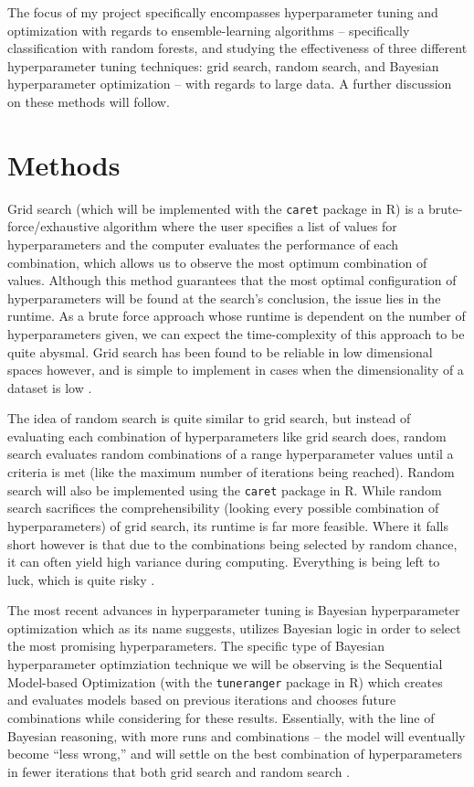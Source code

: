 \documentclass[12pt]{article}
\begin{document}
\label{sec:question}

The focus of my project specifically encompasses hyperparameter tuning
and optimization with regards to ensemble-learning algorithms --
specifically classification with random forests, and studying the
effectiveness of three different hyperparameter tuning techniques: grid
search, random search, and Bayesian hyperparameter optimization -- with
regards to large data. A further discussion on these methods will
follow.

\hypertarget{methods}{%
\section{Methods}\label{methods}}

\label{sec:methods}

Grid search (which will be implemented with the \texttt{caret} package
in R) is a brute-force/exhaustive algorithm where the user specifies a
list of values for hyperparameters and the computer evaluates the
performance of each combination, which allows us to observe the most
optimum combination of values. Although this method guarantees that the
most optimal configuration of hyperparameters will be found at the
search's conclusion, the issue lies in the runtime. As a brute force
approach whose runtime is dependent on the number of hyperparameters
given, we can expect the time-complexity of this approach to be quite
abysmal. Grid search has been found to be reliable in low dimensional
spaces however, and is simple to implement in cases when the
dimensionality of a dataset is low \citep{Bergstra2012}.

The idea of random search is quite similar to grid search, but instead
of evaluating each combination of hyperparameters like grid search does,
random search evaluates random combinations of a range hyperparameter
values until a criteria is met (like the maximum number of iterations
being reached). Random search will also be implemented using the
\texttt{caret} package in R. While random search sacrifices the
comprehensibility (looking every possible combination of
hyperparameters) of grid search, its runtime is far more feasible. Where
it falls short however is that due to the combinations being selected by
random chance, it can often yield high variance during computing.
Everything is being left to luck, which is quite risky
\citep{Bergstra2012}.

The most recent advances in hyperparameter tuning is Bayesian
hyperparameter optimization which as its name suggests, utilizes
Bayesian logic in order to select the most promising hyperparameters.
The specific type of Bayesian hyperparameter optimziation technique we
will be observing is the Sequential Model-based Optimization (with the
\texttt{tuneranger} package in R) which creates and evaluates models
based on previous iterations and chooses future combinations while
considering for these results. Essentially, with the line of Bayesian
reasoning, with more runs and combinations -- the model will eventually
become ``less wrong,'' and will settle on the best combination of
hyperparameters in fewer iterations that both grid search and random
search \citep{Probst2019}.
\end{document}
